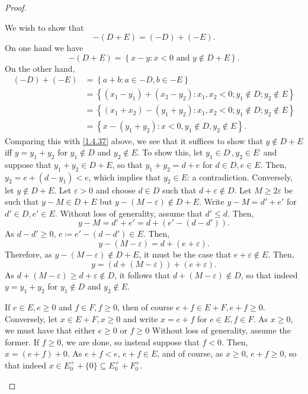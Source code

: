 \begin{thm}
\begin{proof}
\begin{savenotes}
\label{stp1.4.18.9}
We wish to show that
\begin{equation}\label{1.4.37}
-(D+E)=(-D)+(-E).
\end{equation}
On one hand we have
\begin{equation}
-(D+E)=\left\{ x-y:x<0\text{ and }y\notin D+E\right\} .
\end{equation}
On the other hand,
\begin{equation}
\begin{split}
(-D)+(-E) & =\left\{ a+b:a\in -D,b\in -E\right\} \\
& =\left\{ (x_1-y_1)+(x_2-y_2):x_1,x_2<0;y_1\notin D;y_2\notin E\right\} \\
& =\left\{ (x_1+x_2)-(y_1+y_2):x_1,x_2<0;y_1\notin D;y_2\notin E\right\} \\
& =\left\{ x-(y_1+y_2):x<0,y_1\notin D,y_2\notin E\right\} .
\end{split}
\end{equation}
Comparing this with \eqref{1.4.37} above, we see that it suffices to show that $y\notin D+E$ iff $y=y_1+y_2$ for $y_1\notin D$ and $y_2\notin E$.  To show this, let $y_1\in D^{\comp},y_2\in E^{\comp}$ and suppose that $y_1+y_2\in D+E$, so that $y_1+y_2=d+e$ for $d\in D,e\in E$.  Then, $y_2=e+(d-y_1)<e$, which implies that $y_2\in E$:  a contradiction.  Conversely, let $y\notin D+E$.  Let $\varepsilon >0$ and choose $d\in D$ such that $d+\varepsilon \notin D$.  Let $M\geq 2\varepsilon$ be such that $y-M\in D+E$ but $y-(M-\varepsilon )\notin D+E$.  Write $y-M=d'+e'$ for $d'\in D,e'\in E$.  Without loss of generality, assume that $d'\leq d$.  Then,
\begin{equation}
y-M=d'+e'=d+\left( e'-(d-d')\right) .
\end{equation}
As $d-d'\geq 0$, $e\coloneqq e'-(d-d')\in E$.  Then,
\begin{equation}
y-(M-\varepsilon )=d+(e+\varepsilon ).
\end{equation}
Therefore, as $y-(M-\varepsilon )\notin D+E$, it must be the case that $e+\varepsilon \notin E$.  Then,
\begin{equation}
y=\left( d+(M-\varepsilon )\right) +(e+\varepsilon ).
\end{equation}
As $d+(M-\varepsilon )\geq d+\varepsilon \notin D$, it follows that $d+(M-\varepsilon )\notin D$, so that indeed $y=y_1+y_2$ for $y_1\notin D$ and $y_2\notin E$.

If $e\in E,e\geq 0$ and $f\in F,f\geq 0$, then of course $e+f\in E+F,e+f\geq 0$.  Conversely, let $x\in E+F,x\geq 0$ and write $x=e+f$ for $e\in E,f\in F$.  As $x\geq 0$, we must have that either $e\geq 0$ or $f\geq 0$  Without loss of generality, assume the former.  If $f\geq 0$, we are done, so instead suppose that $f<0$.  Then, $x=(e+f)+0$.  As $e+f<e$, $e+f\in E$, and of course, as $x\geq 0$, $e+f\geq 0$, so that indeed $x\in E_0^++\{ 0\} \subseteq E_0^++F_0^+$.


\end{savenotes}
\end{proof}
\end{thm}
